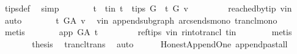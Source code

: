 \begin{isabellebody}
\ tips{\isacharunderscore}{\kern0pt}def\ \isamarkupfalse%
\ simp\isanewline
\ \ \ \ \isamarkupfalse%
\ \isamarkupfalse%
\ t\ \ t{\isacharunderscore}{\kern0pt}in{\isacharcolon}{\kern0pt}\ {\isachardoublequoteopen}t\ {\isasymin}\ tips\ G\ {\isasymand}\ t\ {\isasymrightarrow}\isactrlsup {\isacharplus}{\kern0pt}\isactrlbsub G\isactrlesub \ v{\isachardoublequoteclose}\ \isanewline
\ \ \ \ \ \ \isamarkupfalse%
\ reached{\isacharunderscore}{\kern0pt}by{\isacharunderscore}{\kern0pt}tip\ v{\isacharunderscore}{\kern0pt}in\ \isamarkupfalse%
\ auto\isanewline
\ \ \ \ \isamarkupfalse%
\ \isamarkupfalse%
\ {\isachardoublequoteopen}t\ {\isasymrightarrow}\isactrlsup {\isacharplus}{\kern0pt}\isactrlbsub G{\isacharunderscore}{\kern0pt}A\isactrlesub \ v{\isachardoublequoteclose}\ \isamarkupfalse%
\ v{\isacharunderscore}{\kern0pt}in\ append{\isacharunderscore}{\kern0pt}subgraph\ arcs{\isacharunderscore}{\kern0pt}ends{\isacharunderscore}{\kern0pt}mono\ trancl{\isacharunderscore}{\kern0pt}mono\isanewline
\ \ \ \ \ \ \isamarkupfalse%
\ {\isacharparenleft}{\kern0pt}metis{\isacharparenright}{\kern0pt}\isanewline
\ \ \ \ \isamarkupfalse%
\ \isamarkupfalse%
\ {\isachardoublequoteopen}app\ {\isasymrightarrow}\isactrlsup {\isacharplus}{\kern0pt}\isactrlbsub G{\isacharunderscore}{\kern0pt}A\isactrlesub \ t{\isachardoublequoteclose}\ \isanewline
\ \ \ \ \ \ \isamarkupfalse%
\ ref{\isacharunderscore}{\kern0pt}tips\ v{\isacharunderscore}{\kern0pt}in\ r{\isacharunderscore}{\kern0pt}into{\isacharunderscore}{\kern0pt}trancl{\isacharprime}{\kern0pt}\ t{\isacharunderscore}{\kern0pt}in\isanewline
\ \ \ \ \ \ \isamarkupfalse%
\ {\isacharparenleft}{\kern0pt}metis{\isacharparenright}{\kern0pt}\ \isanewline
\ \ \ \ \isamarkupfalse%
\ \isamarkupfalse%
\ {\isacharquery}{\kern0pt}thesis\ \isamarkupfalse%
\ trancl{\isacharunderscore}{\kern0pt}trans\ \isamarkupfalse%
\ auto\ \isanewline
\ \ \isamarkupfalse%
\isanewline
{}\isamarkupfalse%
%
\endisatagproof
{\isafoldproof}%
%
\isadelimproof
\isanewline
%
\endisadelimproof
\isanewline
{}\isamarkupfalse%
\ {\isacharparenleft}{\kern0pt}\ Honest{\isacharunderscore}{\kern0pt}Append{\isacharunderscore}{\kern0pt}One{\isacharparenright}{\kern0pt}\ append{\isacharunderscore}{\kern0pt}past{\isacharunderscore}{\kern0pt}all{\isacharcolon}{\kern0pt}\isanewline

\end{isabellebody}
